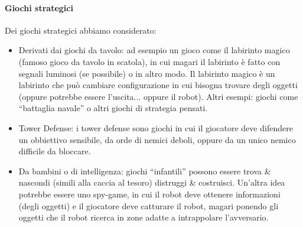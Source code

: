 \paragraph{Giochi strategici} Dei giochi strategici abbiamo considerato:
\begin{itemize}
\item Derivati dai giochi da tavolo: ad esempio un gioco come il labirinto magico (famoso gioco da tavolo in scatola), in cui magari il labirinto è fatto con segnali luminosi (se possibile) o in altro modo. Il labirinto magico è un labirinto che può cambiare configurazione in cui bisogna trovare degli oggetti (oppure potrebbe essere l’uscita... oppure il robot). Altri esempi: giochi come “battaglia navale” o altri giochi di strategia pensati.
\item Tower Defense: i tower defense sono giochi in cui il giocatore deve difendere un obbiettivo sensibile, da orde di nemici deboli, oppure da un unico nemico difficile da bloccare. 
\item Da bambini o di intelligenza: giochi “infantili” possono essere trova \& nascondi (simili alla caccia al tesoro) distruggi \& costruisci. Un'altra idea potrebbe essere uno spy-game, in cui il robot deve ottenere informazioni (degli oggetti) e il giocatore deve catturare il robot, magari ponendo gli oggetti che il robot ricerca in zone adatte a intrappolare l'avversario.
\end{itemize}

